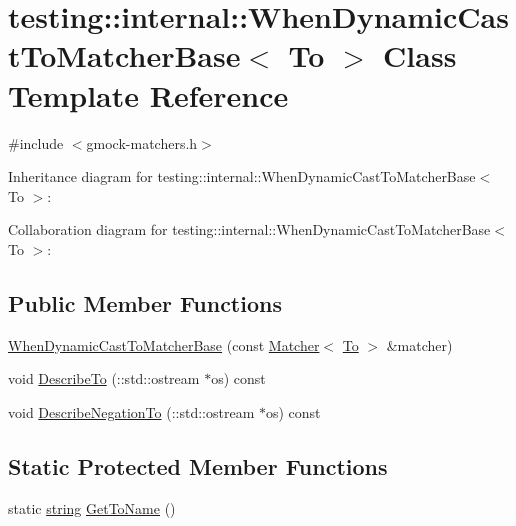 \hypertarget{classtesting_1_1internal_1_1_when_dynamic_cast_to_matcher_base}{}\section{testing\+:\+:internal\+:\+:When\+Dynamic\+Cast\+To\+Matcher\+Base$<$ To $>$ Class Template Reference}
\label{classtesting_1_1internal_1_1_when_dynamic_cast_to_matcher_base}


{\ttfamily \#include $<$gmock-\/matchers.\+h$>$}



Inheritance diagram for testing\+:\+:internal\+:\+:When\+Dynamic\+Cast\+To\+Matcher\+Base$<$ To $>$\+:


Collaboration diagram for testing\+:\+:internal\+:\+:When\+Dynamic\+Cast\+To\+Matcher\+Base$<$ To $>$\+:
\subsection*{Public Member Functions}
\begin{DoxyCompactItemize}
\item 
\hyperlink{classtesting_1_1internal_1_1_when_dynamic_cast_to_matcher_base_a7da2a4c7c43d5e18db0a3233a601c8ab}{When\+Dynamic\+Cast\+To\+Matcher\+Base} (const \hyperlink{classtesting_1_1_matcher}{Matcher}$<$ \hyperlink{classtesting_1_1internal_1_1_to}{To} $>$ \&matcher)
\item 
void \hyperlink{classtesting_1_1internal_1_1_when_dynamic_cast_to_matcher_base_ac5726cb7b40862aabecce4d4d9c6f8b1}{Describe\+To} (\+::std\+::ostream $\ast$os) const 
\item 
void \hyperlink{classtesting_1_1internal_1_1_when_dynamic_cast_to_matcher_base_ac4f1370bc2db15a7242f06ea2e6309c2}{Describe\+Negation\+To} (\+::std\+::ostream $\ast$os) const 
\end{DoxyCompactItemize}
\subsection*{Static Protected Member Functions}
\begin{DoxyCompactItemize}
\item 
static \hyperlink{namespacetesting_1_1internal_a8e8ff5b11e64078831112677156cb111}{string} \hyperlink{classtesting_1_1internal_1_1_when_dynamic_cast_to_matcher_base_a5950142a073ce7a1931848a958c88962}{Get\+To\+Name} ()
\end{DoxyCompactItemize}
